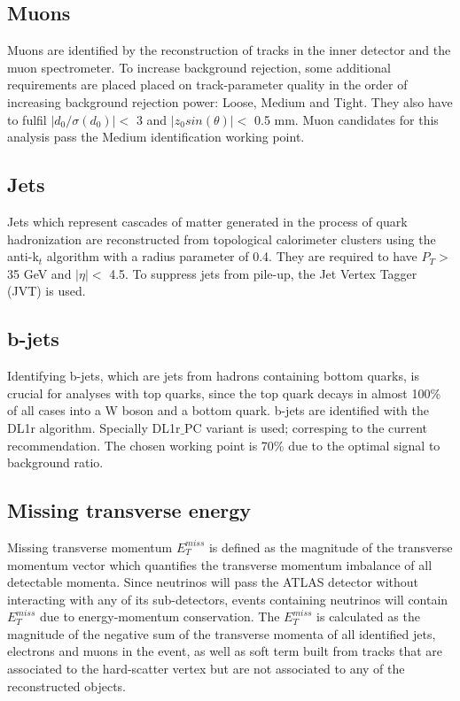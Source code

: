 \subsection{Muons}
\label{subsec:muons}
Muons are identified by the reconstruction of tracks in the inner detector and the muon spectrometer. To increase background rejection, some additional requirements are placed placed on track-parameter quality in the order of increasing background rejection power: Loose, Medium and Tight. They also have to fulfil $|d_{0}/\sigma(d_{0})|<$ 3 and $|z_{0}sin(\theta)|<$ 0.5 mm. Muon candidates for this analysis pass the Medium identification working point.


\subsection{Jets}
Jets which represent cascades of matter generated in the process of quark hadronization are reconstructed from topological calorimeter clusters using the anti-k$_{t}$ algorithm with a radius parameter of 0.4. They are required to have $P_{T}>$ 35 GeV and $|\eta|<$ 4.5. To suppress jets from pile-up, the Jet Vertex Tagger (JVT) is used.

\subsection{b-jets}
Identifying b-jets, which are jets from hadrons containing bottom quarks, is crucial for analyses with top quarks, since the top quark decays in almost 100\% of all cases into a W boson and a bottom quark. b-jets are identified with the DL1r algorithm. Specially DL1r$\_$PC variant is used; corresping to the current recommendation. The chosen working point is 70\% due to the optimal signal to background ratio.

\subsection{Missing transverse energy}
Missing transverse momentum $E_{T}^{miss}$ is defined as the magnitude of the transverse momentum vector which quantifies the transverse momentum imbalance of all detectable momenta. Since neutrinos will pass the ATLAS detector without interacting with any of its sub-detectors, events containing neutrinos will contain $E_{T}^{miss}$ due to energy-momentum conservation. The $E_{T}^{miss}$ is calculated as the magnitude of the negative sum of the transverse momenta of all identified jets, electrons and muons in the event, as well as soft term built from tracks that are associated to the hard-scatter vertex but are not associated to any of the reconstructed objects. 
